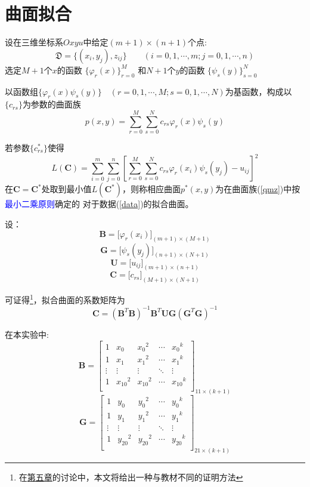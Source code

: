 \newpage
\section{曲面拟合}
\label{sec:qmnh}
设在三维坐标系$Oxyu$中给定$(m+1)\times (n+1)$个点:
\begin{equation}
\label{data}
\mathfrak{D}=\{(x_i,y_j),z_{ij}\}\qquad (i=0,1,\cdots,m;j=0,1,\cdots,n)
\end{equation}
选定$M+1$个$x$的函数
$\{\varphi_{r}(x)\}_{r=0}^M$
和$N+1$个$y$的函数
$\{\psi_{s}(y)\}_{s=0}^N$

以函数组$\{\varphi_{r}(x)\psi_{s}(y)\}\quad (r=0,1,\cdots,M;s=0,1,\cdots,N)$为基函数，构成以$\{c_{rs}\}$为参数的曲面族
\begin{equation}
\label{qmz}
p(x,y) = \sum_{r = 0}^M \sum_{s = 0}^N c_{rs}\varphi_{r}(x)\psi_{s}(y)
\end{equation}
 
若参数$\{ c^{\ast}_{rs}\}$使得
\begin{equation}
\label{cost}
L(\bm{C})=\sum\limits_{i = 0}^{m} {\sum\limits_{j = 0}^{n} \left[{\sum_{r = 0}^M \sum_{s = 0}^N c_{rs}\varphi_{r}(x_i)\psi_{s}(y_j) - u_{ij}}\right]^2} 
\end{equation}
在$\bm{C}=\bm{C}^{\ast}$处取到最小值$L(\bm{C}^{\ast})$，则称相应曲面$p^{\ast}(x,y)$为在曲面族(\ref{qmz})中按
\textcolor{blue}{最小二乘原则}确定的
对于数据(\ref{data})的拟合曲面。

设：
\[\bm{B} =\big[\varphi_{r}(x_i)\big]_{(m+1)\times (M+1)}\]
\[\bm{G} =\big[\psi_{s}(y_j)\big]_{(n+1)\times (N+1)}\]
\[\bm{U} =\big[u_{ij}\big]_{(m+1)\times (n+1)}\]
\[\bm{C} =\big[c_{rs}\big]_{(M+1)\times (N+1)}\]

可证得\footnote{在\hyperref[sec:discuss]{第五章}的讨论中，本文将给出一种与教材不同的证明方法}，拟合曲面的系数矩阵为
\begin{equation}
\label{c}
\bm{C}=(\bm{B}^T\bm{B})^{-1}\bm{B}^T\bm{U}\bm{G}(\bm{G}^T\bm{G})^{-1}
\end{equation}

在本实验中:
\[\bm{B}=
\begin{bmatrix}
1&{x_0}&{x_0}^{2}& \cdots &{x_0}^{k}\\
1&{x_1}&{x_1}^{2}& \cdots &{x_1}^{k}\\
 \vdots & \vdots & \vdots & \ddots & \vdots \\
1&{x_{10}}^2&{x_{10}}^{2}& \cdots &{x_{10}}^{k}\\
\end{bmatrix}_{11\times (k+1)}\]
\[\bm{G}=
\begin{bmatrix}
1&{y_0}&{y_0}^{2}& \cdots &{y_0}^{k}\\
1&{y_1}&{y_1}^{2}& \cdots &{y_1}^{k}\\
 \vdots & \vdots & \vdots & \ddots & \vdots \\
1&{y_{20}}^2&{y_{20}}^{2}& \cdots &{y_{20}}^{k}\\
\end{bmatrix}_{21\times (k+1)}\]

